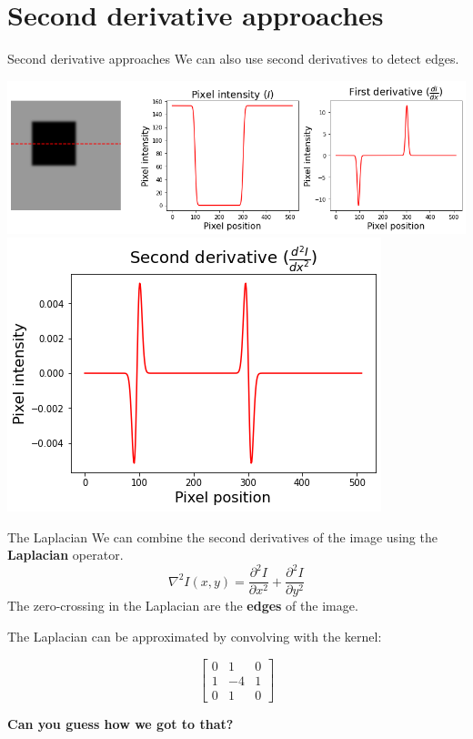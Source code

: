 \documentclass[9pt, aspectratio=169]{beamer}
\begin{document}


\section{Second derivative approaches}

\begin{frame}
    {Second derivative approaches}
    We can also use second derivatives to detect edges.

    \centering
    \includegraphics[width=.7\textwidth]{intensity_derivative.png}
    \pause
    \centering
    \includegraphics[width=.3\textwidth]{intensity_second_derivative.png}
\end{frame}

\begin{frame}
    {The Laplacian}
    We can combine the second derivatives of the image using the \textbf{Laplacian} operator.
    \Large{
    $$\nabla^2 I(x,y) = \frac{\partial^2{I}}{\partial{x^2}}+ \frac{\partial^2{I}}{\partial{y^2}}$$
    }
    \normalsize
    The zero-crossing in the Laplacian are the \textbf{edges} of the image.

    The Laplacian can be approximated by convolving with the kernel:

    $$\begin{bmatrix}
            0 & 1  & 0 \\
            1 & -4 & 1 \\
            0 & 1  & 0
        \end{bmatrix}$$

    \textbf{Can you guess how we got to that?}
\end{frame}
\end{document}
